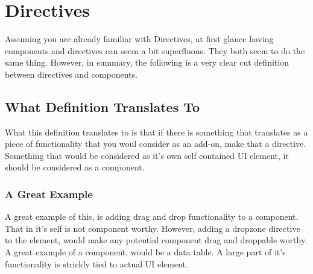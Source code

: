 \section{ Directives }
\maketitle{}

Assuming you are already familiar with Directives, at first glance having
components and directives can seem a bit superfluous. They both seem to do the
same thing. However, in summary, the following is a very clear cut definition
between directives and components.

\subsection{ What Definition Translates To }
What this definition translates to is that if there is something that translates
as a piece of functionality that you woul consider as an add-on, make that a
directive. Something that would be considered as it's own self contained UI
element, it should be considered as a component.

\subsubsection{A Great Example}
A great example of this, is adding drag and drop functionality to a component.
That in it's self is not component worthy. However, adding a dropzone directive
to the element, would make any potential component drag and droppable worthy.
A great example of a component, would be a data table. A large part of it's
functionality is strickly tied to actual UI element.

